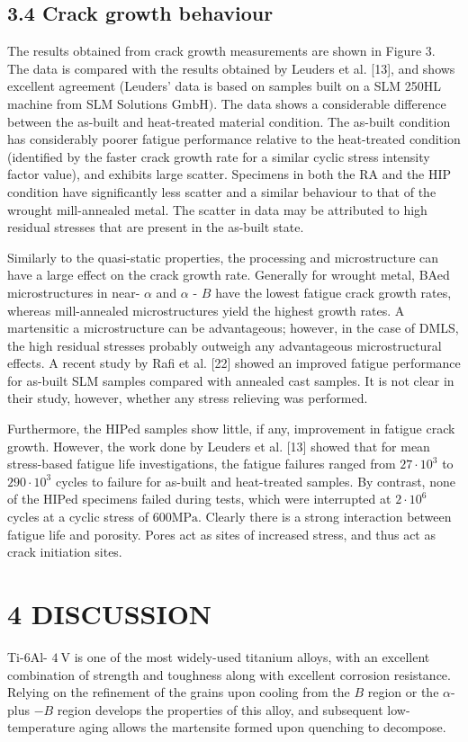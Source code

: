\documentclass[10pt]{article}
\begin{document}
\subsection*{3.4 Crack growth behaviour}
The results obtained from crack growth measurements are shown in Figure 3. The data is compared with the results obtained by Leuders et al. [13], and shows excellent agreement (Leuders' data is based on samples built on a SLM 250HL machine from SLM Solutions $\mathrm{GmbH})$. The data shows a considerable difference between the as-built and heat-treated material condition. The as-built condition has considerably poorer fatigue performance relative to the heat-treated condition (identified by the faster crack growth rate for a similar cyclic stress intensity factor value), and exhibits large scatter. Specimens in both the RA and the HIP condition have significantly less scatter and a similar behaviour to that of the wrought mill-annealed metal. The scatter in data may be attributed to high residual stresses that are present in the as-built state.

Similarly to the quasi-static properties, the processing and microstructure can have a large effect on the crack growth rate. Generally for wrought metal, BAed microstructures in near- $\alpha$ and $\alpha$ - $B$ have the lowest fatigue crack growth rates, whereas mill-annealed microstructures yield the highest growth rates. A martensitic a microstructure can be advantageous; however, in the case of DMLS, the high residual stresses probably outweigh any advantageous microstructural effects. A recent study by Rafi et al. [22] showed an improved fatigue performance for as-built SLM samples compared with annealed cast samples. It is not clear in their study, however, whether any stress relieving was performed.

Furthermore, the HIPed samples show little, if any, improvement in fatigue crack growth. However, the work done by Leuders et al. [13] showed that for mean stress-based fatigue life investigations, the fatigue failures ranged from $27 \cdot 10^{3}$ to $290 \cdot 10^{3}$ cycles to failure for as-built and heat-treated samples. By contrast, none of the HIPed specimens failed during tests, which were interrupted at $2 \cdot 10^{6}$ cycles at a cyclic stress of $600 \mathrm{MPa}$. Clearly there is a strong interaction between fatigue life and porosity. Pores act as sites of increased stress, and thus act as crack initiation sites.

\section*{4 DISCUSSION}
Ti-6Al- $4 \mathrm{~V}$ is one of the most widely-used titanium alloys, with an excellent combination of strength and toughness along with excellent corrosion resistance. Relying on the refinement of the grains upon cooling from the $B$ region or the $\alpha$-plus $-B$ region develops the properties of this alloy, and subsequent low-temperature aging allows the martensite formed upon quenching to decompose.
\end{document}
